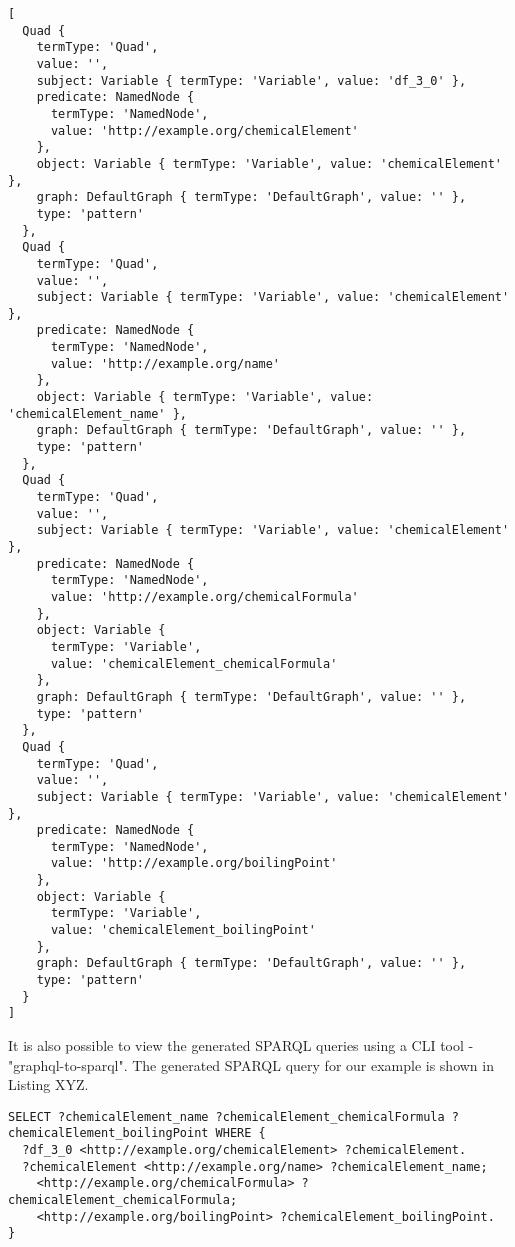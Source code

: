 \begin{minipage}{\linewidth}
\begin{lstlisting}[label=listing:listing9, caption={The expansion of Quads}]
[
  Quad {
    termType: 'Quad',
    value: '',
    subject: Variable { termType: 'Variable', value: 'df_3_0' },
    predicate: NamedNode {
      termType: 'NamedNode',
      value: 'http://example.org/chemicalElement'
    },
    object: Variable { termType: 'Variable', value: 'chemicalElement' },
    graph: DefaultGraph { termType: 'DefaultGraph', value: '' },
    type: 'pattern'
  },
  Quad {
    termType: 'Quad',
    value: '',
    subject: Variable { termType: 'Variable', value: 'chemicalElement' },
    predicate: NamedNode {
      termType: 'NamedNode',
      value: 'http://example.org/name'
    },
    object: Variable { termType: 'Variable', value: 'chemicalElement_name' },
    graph: DefaultGraph { termType: 'DefaultGraph', value: '' },
    type: 'pattern'
  },
  Quad {
    termType: 'Quad',
    value: '',
    subject: Variable { termType: 'Variable', value: 'chemicalElement' },
    predicate: NamedNode {
      termType: 'NamedNode',
      value: 'http://example.org/chemicalFormula'
    },
    object: Variable {
      termType: 'Variable',
      value: 'chemicalElement_chemicalFormula'
    },
    graph: DefaultGraph { termType: 'DefaultGraph', value: '' },
    type: 'pattern'
  },
  Quad {
    termType: 'Quad',
    value: '',
    subject: Variable { termType: 'Variable', value: 'chemicalElement' },
    predicate: NamedNode {
      termType: 'NamedNode',
      value: 'http://example.org/boilingPoint'
    },
    object: Variable {
      termType: 'Variable',
      value: 'chemicalElement_boilingPoint'
    },
    graph: DefaultGraph { termType: 'DefaultGraph', value: '' },
    type: 'pattern'
  }
]
\end{lstlisting}
\end{minipage}

It is also possible to view the generated SPARQL queries using a CLI tool - "graphql-to-sparql". The generated SPARQL query for our example is shown in Listing XYZ.

\begin{minipage}{\linewidth}
\begin{lstlisting}[label=listing:listing10, caption={Genertaed SPARQL query}]
SELECT ?chemicalElement_name ?chemicalElement_chemicalFormula ?chemicalElement_boilingPoint WHERE {
  ?df_3_0 <http://example.org/chemicalElement> ?chemicalElement.
  ?chemicalElement <http://example.org/name> ?chemicalElement_name;
    <http://example.org/chemicalFormula> ?chemicalElement_chemicalFormula;
    <http://example.org/boilingPoint> ?chemicalElement_boilingPoint.
}
\end{lstlisting}
\end{minipage}

